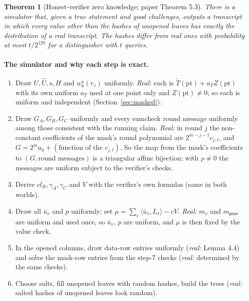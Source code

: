 \documentclass[11pt,a4paper]{article}
\newcommand{\ip}[2]{\langle #1, #2\rangle}
\newcommand{\mle}[1]{\widetilde{#1}}
\newcommand{\msk}[1]{#1^{\star}}
\theoremstyle{definition}
\theoremstyle{plain}
\newtheorem{theorem}[definition]{Theorem}
\begin{document}
\begin{theorem}[Honest-verifier zero knowledge; paper Theorem 5.3]
There is a simulator that, given a true statement and good challenges, outputs a transcript in which every
value other than the hashes of unopened leaves has exactly the distribution of a real transcript. The
hashes differ from real ones with probability at most $t/2^{128}$ for a distinguisher with $t$ queries.
\end{theorem}

\paragraph{The simulator and why each step is exact.}
\begin{enumerate}[leftmargin=1.5em]
\item Draw $U,\hat U,s,H$ and $\msk w_k(r_z)$ uniformly. \emph{Real:} each is $\mle T(\text{pt})+a_TZ(\text{pt})$
  with its own uniform $a_T$ used at one point only and $Z(\text{pt})\neq 0$; so each is uniform and
  independent (Section~\ref{sec:masked}).
\item Draw $G_A,G_B,G_C$ uniformly and every sumcheck round message uniformly among those consistent with
  the running claim. \emph{Real:} in round $j$ the non-constant coefficients of the mask's round polynomial
  are $2^{m-j-1}c_{j,t}$, and $G=2^ma_0+(\text{function of the }c_{j,t})$. So the map from the mask's
  coefficients to $(G,\text{round messages})$ is a triangular affine bijection; with $\rho\neq 0$ the
  messages are uniform subject to the verifier's checks.
\item Derive $\mathit{cl}_B,\gamma_A,\gamma_C$ and $V$ with the verifier's own formulas (same in both worlds).
\item Draw all $\bar u_v$ and $p$ uniformly; set $\mu=\sum_v\ip{\bar u_v}{L_v}-cV$. \emph{Real:} $m_v$ and
  $m_{\mathsf{prox}}$ are uniform and used once, so $\bar u_v$, $p$ are uniform, and $\mu$ is then fixed by the
  value check.
\item In the opened columns, draw data-row entries uniformly (\emph{real:} Lemma 4.4) and solve the mask-row
  entries from the step-7 checks (\emph{real:} determined by the same checks).
\item Choose salts, fill unopened leaves with random hashes, build the trees (\emph{real:} salted hashes of
  unopened leaves look random).
\end{enumerate}
\end{document}

